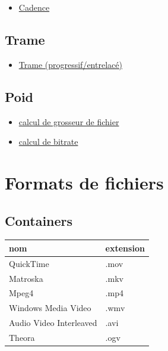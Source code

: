 \documentclass[
]{book}
\providecommand{\tightlist}{%
  \setlength{\itemsep}{0pt}\setlength{\parskip}{0pt}}
\begin{document}
\begin{itemize}
\tightlist
\item
  \href{https://frames-per-second.appspot.com}{Cadence}
\end{itemize}

\hypertarget{trame}{%
\subsection{Trame}\label{trame}}

\begin{itemize}
\tightlist
\item
  \href{https://web.archive.org/web/20140222010640/http://neuron2.net/LVG/interlacing.html}{Trame (progressif/entrelacé)}
\end{itemize}

\hypertarget{poid}{%
\subsection{Poid}\label{poid}}

\begin{itemize}
\tightlist
\item
  \href{https://toolstud.io/video/filesize.php?imagewidth=1920\&imageheight=1080\&framerate=29.97\&timeduration=60\&timeunit=seconds}{calcul de grosseur de fichier}
\item
  \href{https://toolstud.io/video/bitrate.php?imagewidth=1\&imageheight=1\&colordepth=24\&framerate=29.97}{calcul de bitrate}
\end{itemize}

\hypertarget{lexique_fichiers}{%
\section{Formats de fichiers}\label{lexique_fichiers}}

\hypertarget{containers}{%
\subsection{Containers}\label{containers}}

\begin{longtable}[]{@{}ll@{}}
\toprule
nom & extension\tabularnewline
\midrule
\endhead
QuickTime & .mov\tabularnewline
Matroska & .mkv\tabularnewline
Mpeg4 & .mp4\tabularnewline
Windows Media Video & .wmv\tabularnewline
Audio Video Interleaved & .avi\tabularnewline
Theora & .ogv\tabularnewline
\bottomrule
\end{longtable}
\end{document}
